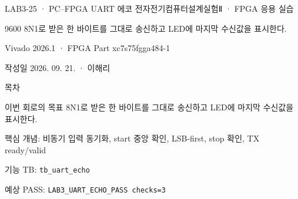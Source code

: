 

\renewcommand{\small}{\fontsize{8.7}{10.5}\selectfont}
\setlength{\leftmargini}{1.35em}

\begin{frame}{LAB3-25 · PC–FPGA UART 에코}
\small
전자전기컴퓨터설계실험Ⅱ · FPGA 응용 실습\par\vspace{0.28cm}
9600 8N1로 받은 한 바이트를 그대로 송신하고 LED에 마지막 수신값을 표시한다.\par\vspace{0.28cm}
Vivado 2026.1 · FPGA Part xc7s75fgga484-1\par\vspace{0.28cm}
작성일 2026. 09. 21. · 이해리
\end{frame}

\begin{frame}[label=lab3-contents]{목차}
\small
{}\par\vspace{0.28cm}
\par\vspace{0.28cm}
\par\vspace{0.28cm}
\par\vspace{0.28cm}
\par\vspace{0.28cm}
\end{frame}

\begin{frame}[label=goal]{이번 회로의 목표}
\small
9600 8N1로 받은 한 바이트를 그대로 송신하고 LED에 마지막 수신값을 표시한다.\par\vspace{0.28cm}
핵심 개념: 비동기 입력 동기화, start 중앙 확인, LSB-first, stop 확인, TX ready/valid\par\vspace{0.28cm}
기능 TB: \texttt{tb\_uart\_echo}\par\vspace{0.18cm}
예상 PASS: \texttt{LAB3\_UART\_ECHO\_PASS checks=3}
\end{frame}

